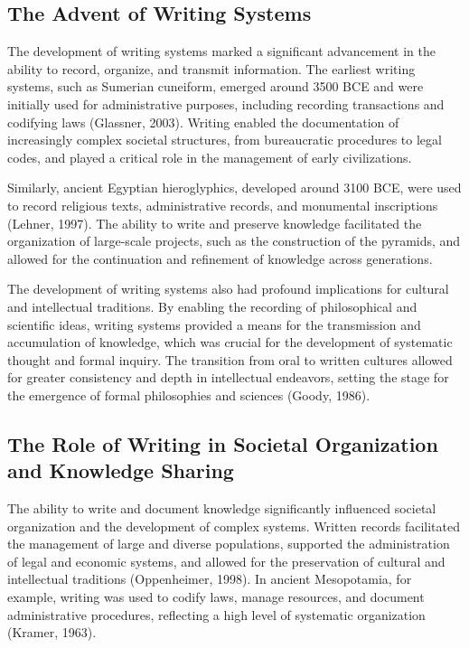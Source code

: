 \documentclass[twocolumn]{article}
\begin{document}
\subsection{The Advent of Writing Systems}

\textcolor{primary}{The development of writing systems marked a significant advancement in the ability to record, organize, and transmit information. The earliest writing systems, such as Sumerian cuneiform, emerged around 3500 BCE and were initially used for administrative purposes, including recording transactions and codifying laws (Glassner, 2003). Writing enabled the documentation of increasingly complex societal structures, from bureaucratic procedures to legal codes, and played a critical role in the management of early civilizations.}

\textcolor{secondary}{Similarly, ancient Egyptian hieroglyphics, developed around 3100 BCE, were used to record religious texts, administrative records, and monumental inscriptions (Lehner, 1997). The ability to write and preserve knowledge facilitated the organization of large-scale projects, such as the construction of the pyramids, and allowed for the continuation and refinement of knowledge across generations.}

\textcolor{primary}{The development of writing systems also had profound implications for cultural and intellectual traditions. By enabling the recording of philosophical and scientific ideas, writing systems provided a means for the transmission and accumulation of knowledge, which was crucial for the development of systematic thought and formal inquiry. The transition from oral to written cultures allowed for greater consistency and depth in intellectual endeavors, setting the stage for the emergence of formal philosophies and sciences (Goody, 1986).}

\subsection{The Role of Writing in Societal Organization and Knowledge Sharing}

\textcolor{primary}{The ability to write and document knowledge significantly influenced societal organization and the development of complex systems. Written records facilitated the management of large and diverse populations, supported the administration of legal and economic systems, and allowed for the preservation of cultural and intellectual traditions (Oppenheimer, 1998). In ancient Mesopotamia, for example, writing was used to codify laws, manage resources, and document administrative procedures, reflecting a high level of systematic organization (Kramer, 1963).}
\end{document}
